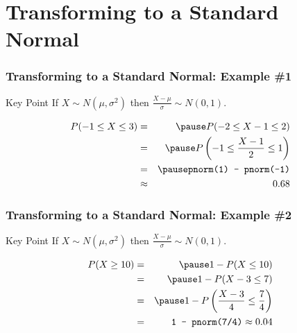 \section{Transforming to a Standard Normal}
\begin{frame}[t]
  \frametitle{Transforming to a Standard Normal: Example \#1}

  \vspace{1em}

  \begin{alertblock}{Key Point}
    If $X \sim N(\mu, \sigma^2)$ then $\frac{X - \mu}{\sigma} \sim N(0,1)$.
  \end{alertblock}

  \begin{eqnarray*}
    P(-1 \leq X \leq 3) &=& \pause P(-2 \leq X - 1 \leq 2) \\
    &=& \pause P\left( -1 \leq \frac{X - 1}{2} \leq 1 \right)\\
    &=& \pause \texttt{pnorm(1) - pnorm(-1)}\\
    &\approx& 0.68
  \end{eqnarray*}

\end{frame}
\begin{frame}[t]
  \frametitle{Transforming to a Standard Normal: Example \#2}


  \vspace{1em}

  \begin{alertblock}{Key Point}
    If $X \sim N(\mu, \sigma^2)$ then $\frac{X - \mu}{\sigma} \sim N(0,1)$.
  \end{alertblock}

  \begin{eqnarray*}
    P(X \geq 10) &=& \pause 1 - P(X \leq 10)\\
    &=& \pause 1 - P(X - 3 \leq 7) \\
    &=& \pause 1 - P\left( \frac{X - 3}{4} \leq \frac{7}{4} \right)\\
    &=& \texttt{1 - pnorm(7/4)} \approx 0.04
  \end{eqnarray*}

\end{frame}
